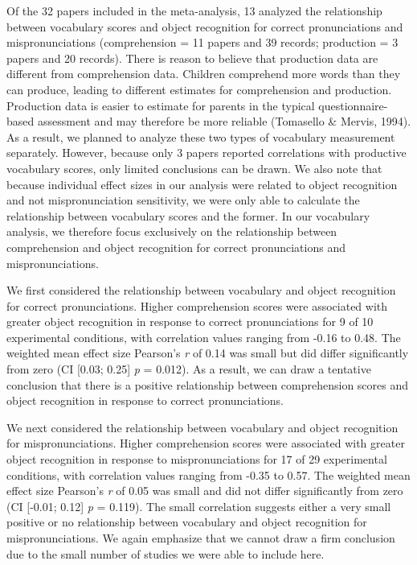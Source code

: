 \documentclass[man]{apa6}
\begin{document}
Of the 32 papers included in the meta-analysis, 13 analyzed the relationship between vocabulary scores and object recognition for correct pronunciations and mispronunciations (comprehension = 11 papers and 39 records; production = 3 papers and 20 records). There is reason to believe that production data are different from comprehension data. Children comprehend more words than they can produce, leading to different estimates for comprehension and production. Production data is easier to estimate for parents in the typical questionnaire-based assessment and may therefore be more reliable (Tomasello \& Mervis, 1994). As a result, we planned to analyze these two types of vocabulary measurement separately. However, because only 3 papers reported correlations with productive vocabulary scores, only limited conclusions can be drawn. We also note that because individual effect sizes in our analysis were related to object recognition and not mispronunciation sensitivity, we were only able to calculate the relationship between vocabulary scores and the former. In our vocabulary analysis, we therefore focus exclusively on the relationship between comprehension and object recognition for correct pronunciations and mispronunciations.

We first considered the relationship between vocabulary and object recognition for correct pronunciations. Higher comprehension scores were associated with greater object recognition in response to correct pronunciations for 9 of 10 experimental conditions, with correlation values ranging from -0.16 to 0.48. The weighted mean effect size Pearson's \emph{r} of 0.14 was small but did differ significantly from zero (CI {[}0.03; 0.25{]} \emph{p} = 0.012). As a result, we can draw a tentative conclusion that there is a positive relationship between comprehension scores and object recognition in response to correct pronunciations.

We next considered the relationship between vocabulary and object recognition for mispronunciations. Higher comprehension scores were associated with greater object recognition in response to mispronunciations for 17 of 29 experimental conditions, with correlation values ranging from -0.35 to 0.57. The weighted mean effect size Pearson's \emph{r} of 0.05 was small and did not differ significantly from zero (CI {[}-0.01; 0.12{]} \emph{p} = 0.119). The small correlation suggests either a very small positive or no relationship between vocabulary and object recognition for mispronunciations. We again emphasize that we cannot draw a firm conclusion due to the small number of studies we were able to include here.
\end{document}
